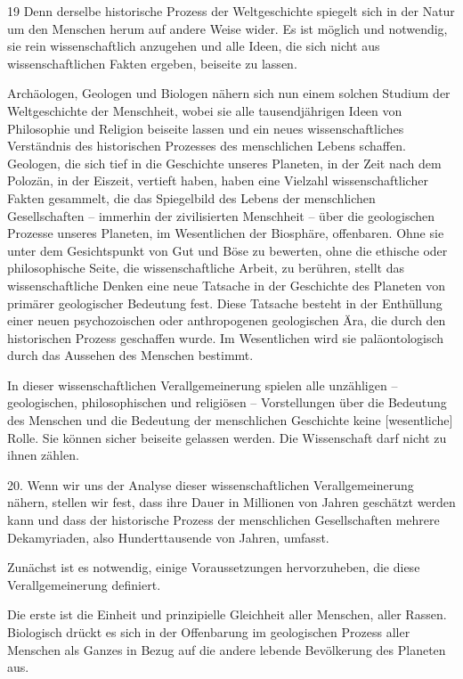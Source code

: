 \documentclass[11pt,a4paper]{book}
\begin{document}
19 Denn derselbe historische Prozess der Weltgeschichte spiegelt sich in der Natur um den Menschen herum auf andere Weise wider. Es ist möglich und notwendig, sie rein wissenschaftlich anzugehen und alle Ideen, die sich nicht aus wissenschaftlichen Fakten ergeben, beiseite zu lassen. 

Archäologen, Geologen und Biologen nähern sich nun einem solchen Studium der Weltgeschichte der Menschheit, wobei sie alle tausendjährigen Ideen von Philosophie und Religion beiseite lassen und ein neues wissenschaftliches Verständnis des historischen Prozesses des menschlichen Lebens schaffen. Geologen, die sich tief in die Geschichte unseres Planeten, in der Zeit nach dem Polozän, in der Eiszeit, vertieft haben, haben eine Vielzahl wissenschaftlicher Fakten gesammelt, die das Spiegelbild des Lebens der menschlichen Gesellschaften -- immerhin der zivilisierten Menschheit -- über die geologischen Prozesse unseres Planeten, im Wesentlichen der Biosphäre, offenbaren. Ohne sie unter dem Gesichtspunkt von Gut und Böse zu bewerten, ohne die ethische oder philosophische Seite, die wissenschaftliche Arbeit, zu berühren, stellt das wissenschaftliche Denken eine neue Tatsache in der Geschichte des Planeten von primärer geologischer Bedeutung fest. Diese Tatsache besteht in der Enthüllung einer neuen psychozoischen oder anthropogenen geologischen Ära, die durch den historischen Prozess geschaffen wurde. Im Wesentlichen wird sie paläontologisch durch das Aussehen des Menschen bestimmt. 

In dieser wissenschaftlichen Verallgemeinerung spielen alle unzähligen -- geologischen, philosophischen und religiösen -- Vorstellungen über die Bedeutung des Menschen und die Bedeutung der menschlichen Geschichte keine [wesentliche] Rolle. Sie können sicher beiseite gelassen werden. Die Wissenschaft darf nicht zu ihnen zählen. 

20. Wenn wir uns der Analyse dieser wissenschaftlichen Verallgemeinerung nähern, stellen wir fest, dass ihre Dauer in Millionen von Jahren geschätzt werden kann und dass der historische Prozess der menschlichen Gesellschaften mehrere Dekamyriaden, also Hunderttausende von Jahren, umfasst. 

Zunächst ist es notwendig, einige Voraussetzungen hervorzuheben, die diese Verallgemeinerung definiert. 

Die erste ist die Einheit und prinzipielle Gleichheit aller Menschen, aller Rassen. Biologisch drückt es sich in der Offenbarung im geologischen Prozess aller Menschen als Ganzes in Bezug auf die andere lebende Bevölkerung des Planeten aus. 
\end{document}
